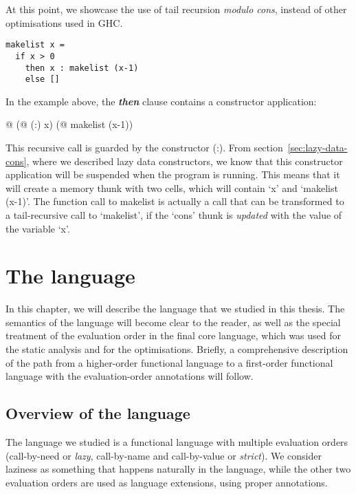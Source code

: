 \documentclass[diploma]{softlab-thesis}
\begin{document}
At this point, we showcase the use of tail recursion \textit{modulo cons}, instead of other optimisations
used in GHC.

\begin{verbatim}
makelist x = 
  if x > 0 
    then x : makelist (x-1)
    else []
\end{verbatim}

In the example above, the \textbf{\textit{then}} clause contains a constructor 
application: 
\begin{center}
  @ (@ (:) x) (@ makelist (x-1))
\end{center}

This recursive call is guarded by the constructor (:).
From section~\ref{sec:lazy-data-cons}, where we described lazy data constructors,
we know that this constructor application will be suspended when 
the program is running. This means that it will create a memory 
thunk with two cells, which will contain `x' and `makelist (x-1)'.
The function call to makelist is actually a call that can be transformed 
to a tail-recursive call to `makelist', if the `cons' thunk is \textit{updated} 
with the value of the variable `x'. 

\chapter {The language}
\label{ch:language}

In this chapter, we will describe the language that we studied in this thesis.
The semantics of the language will become clear to the reader, as well as 
the special treatment of the evaluation order in the final core 
language, which was used for the static analysis and for the optimisations. Briefly, a 
comprehensive description of the path from a higher-order functional language 
to a first-order functional language with the evaluation-order annotations will follow.

\section {Overview of the language }
\label{sec:language-overview}

The language we studied is a functional language 
with multiple evaluation orders (call-by-need or 
\textit{lazy}, call-by-name and call-by-value or \textit{strict}).
We consider laziness as something that happens naturally in the language, while 
the other two evaluation orders are used as language extensions,
using proper annotations.
\end{document}
